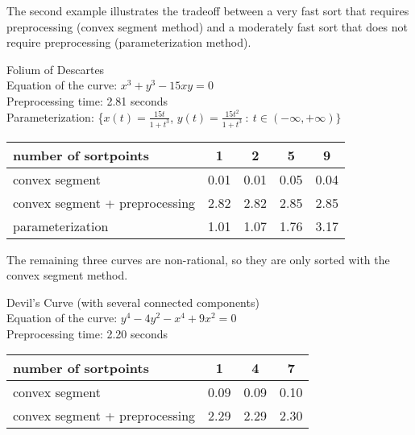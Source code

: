 The second example illustrates the tradeoff between a very fast sort 
that requires preprocessing (convex segment method) and a moderately fast 
sort that does not require preprocessing (parameterization method).
%
\begin{example}
\label{eg-folium}
Folium of Descartes\\
Equation of the curve: $x^{3} + y^{3} - 15xy = 0$\\
Preprocessing time: 2.81 seconds\\
Parameterization: \{$x(t) = \frac{15t}{1+t^{3}}$, \vspace{.5in}$y(t) = 
\frac{15t^{2}}{1+t^{3}}\ :\ t \in (-\infty, +\infty) \}$ \\
%
\begin{tabular}{|l|c|c|c|c|} \hline
number of sortpoints & 1 & 2 & 5 & 9 \\ \hline \hline
convex segment &           0.01 & 0.01 & 0.05 & 0.04 \\ \hline
convex segment + preprocessing & 2.82 & 2.82 & 2.85 & 2.85 \\ \hline
parameterization & 1.01 & 1.07 & 1.76 & 3.17 \\ \hline
\end{tabular}
%
\end{example}
%
The remaining three curves are non-rational, so they are only 
sorted with the convex segment method.

\begin{example}
\label{eg-devil}
Devil's Curve (with several connected components)\\
Equation of the curve: $y^{4} - 4y^{2} - x^{4} + 9x^{2} = 0$\\
Preprocessing time: 2.20 \vspace{.5in}seconds\\
%
\begin{tabular}{|l|c|c|c|} \hline
number of sortpoints & 1 & 4 & 7 \\ \hline \hline
convex segment & 0.09 & 0.09 & 0.10 \\ \hline
convex segment + preprocessing & 2.29 & 2.29 & 2.30 \\ \hline
\end{tabular}
\end{example}


